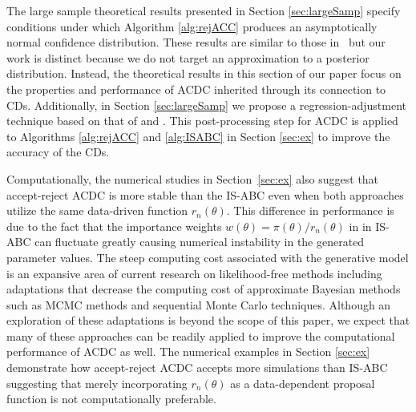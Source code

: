 The large sample theoretical results presented in Section \ref{sec:largeSamp} specify conditions under which Algorithm \ref{alg:rejACC} produces an asymptotically normal confidence distribution. These results are similar to those in~\cite{Li2017} %
but our work is distinct because we do not target an approximation to a posterior distribution. Instead, the theoretical results in this section of our paper focus on the properties and performance of ACDC inherited through its connection to CDs. Additionally, in Section \ref{sec:largeSamp} we propose a regression-adjustment technique based on that of \cite{Li2017} and \cite{Blum2010}. This post-processing step for ACDC is applied to Algorithms \ref{alg:rejACC} and \ref{alg:ISABC} in Section \ref{sec:ex} to improve the accuracy of the CDs.


Computationally, the numerical studies in Section~\ref{sec:ex} also suggest that 
accept-reject ACDC %
is more stable than the IS-ABC %
even when both approaches utilize the same data-driven function $r_{n}(\theta)$. This difference in performance is due to the fact that the importance weights  $w(\theta)=\pi(\theta)/r_{n}(\theta)$ in in IS-ABC %
can fluctuate greatly causing numerical instability in the generated parameter values. %
The steep computing cost associated with the generative model is an expansive area of current research on likelihood-free methods including adaptations that decrease the computing cost of approximate Bayesian methods %
such as MCMC methods \cite[]{marjoram2003markov} and sequential Monte Carlo techniques\cite[]{Sisson2007}. Although an exploration of these adaptations is beyond the scope of this paper, we expect that many of these approaches can be readily applied to improve the computational performance of ACDC as well. %
The numerical examples in Section \ref{sec:ex} 
demonstrate how accept-reject ACDC 
accepts more simulations than IS-ABC
suggesting that merely incorporating $r_n(\theta)$ as a data-dependent proposal function is not computationally preferable. 

